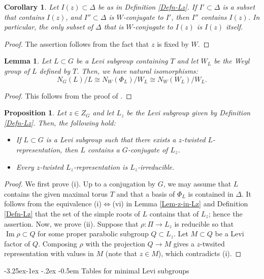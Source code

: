 \documentclass[11pt,oneside,dvipsnames]{amsart}
\makeatletter
\renewcommand\subsection{\@startsection{subsection}{3}{\z@}%
                                     {-3.25ex\@plus -1ex \@minus -.2ex}%
                                     {-0.5em}%
                                     {\normalfont\normalsize\bfseries}}
\theoremstyle{plain}
\newtheorem{Prop}[Thm]{Proposition}
\newtheorem{Lem}[Thm]{Lemma}
\newtheorem{Cor}[Thm]{Corollary}
\theoremstyle{definition}
\theoremstyle{named}
\DeclareMathOperator{\Ima}{Im}
\makeatother
\begin{document}
\begin{Cor}
Let $I(z)\subset\Delta$ be as in Definition \ref{Defn-Lz}. If $I'\subset\Delta$ is a subset that contains $I(z)$, and $I''\subset\Delta$ is $W$-conjugate to $I'$, then $I''$ contains $I(z)$. In particular, the only subset of $\Delta$ that is $W$-conjugate to $I(z)$ is $I(z)$ itself.
\end{Cor}
\begin{proof}
The assertion follows from the fact that $z$ is fixed by $W$.
\end{proof}
\begin{Lem}\label{Lem-N_W(W_z)/W_z}
Let $L\subset G$ be a Levi subgroup containing $T$ and let $W_L$ be the Weyl group of $L$ defined by $T$. Then, we have natural isomorphisms:
$$
N_G(L)/L\cong N_W(\Phi_L)/W_L\cong N_W(W_L)/W_L.
$$
\end{Lem}
\begin{proof}
This follows from the proof of \cite[Proposition 3.4.3]{DM20}.
\end{proof}
\begin{Prop}\label{Prop-L-supset-L_z}
Let $z\in Z_G$ and let $L_z$ be the Levi subgroup given by Definition \ref{Defn-Lz}. Then, the following hold:
\begin{itemize}
\item[(i)] If $L\subset G$ is a Levi subgroup such that there exists a $z$-twisted $L$-representation, then $L$ contains a $G$-conjugate of $L_z$.
\item[(ii)] Every $z$-twisted $L_z$-representation is $L_z$-irreducible.
\end{itemize}
\end{Prop}
\begin{proof}
We first prove (i).  Up to a conjugation by $G$, we may assume that $L$ contains the given maximal torus $T$ and that a basis of $\Phi_L$ is contained in $\Delta$. It follows from the equivalence (i)$\Leftrightarrow$(vi) in Lemma \ref{Lem-z-in-Lz} and Definition \ref{Defn-Lz} that the set of the simple roots of $L$ contains that of $L_z$; hence the assertion. Now, we prove (ii). Suppose that $\rho:\Pi\rightarrow L_z$ is reducible so that $\Ima\rho\subset Q$ for some proper parabolic subgroup $Q\subset L_z$. Let $M\subset Q$ be a Levi factor of $Q$. Composing $\rho$ with the projection $Q\rightarrow M$ gives a $z$-twsited representation with values in $M$ (note that $z\in M$), which contradicts (i).
\end{proof}

\subsection{Tables for minimal Levi subgroups}\label{subsec-Table-BFM}\hfill
\end{document}
